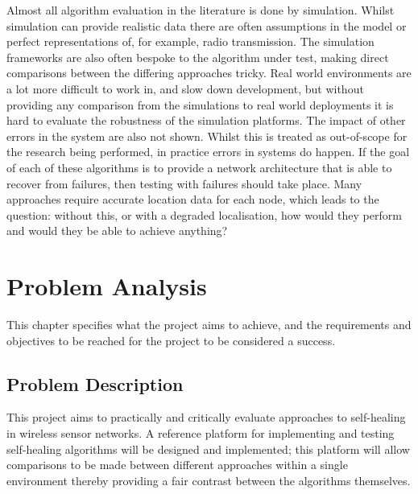 \documentclass[authoryearcitations]{UoYCSproject}
\begin{document}

Almost all algorithm evaluation in the literature is done by simulation. Whilst simulation can provide realistic data there are often assumptions in the model or perfect representations of, for example, radio transmission. The simulation frameworks are also often bespoke to the algorithm under test, making direct comparisons between the differing approaches tricky. Real world environments are a lot more difficult to work in, and slow down development, but without providing any comparison from the simulations to real world deployments it is hard to evaluate the robustness of the simulation platforms. The impact of other errors in the system are also not shown. Whilst this is treated as out-of-scope for the research being performed, in practice errors in systems do happen. If the goal of each of these algorithms is to provide a network architecture that is able to recover from failures, then testing with failures should take place. Many approaches require accurate location data for each node, which leads to the question: without this, or with a degraded localisation, how would they perform and would they be able to achieve anything?



%

\chapter{Problem Analysis}
\label{cha:Problem}

This chapter specifies what the project aims to achieve, and the requirements and objectives to be reached for the project to be considered a success.

\section{Problem Description}
This project aims to practically and critically evaluate approaches to self-healing in wireless sensor networks. A reference platform for implementing and testing self-healing algorithms will be designed and implemented; this platform will allow comparisons to be made between different approaches within a single environment thereby providing a fair contrast between the algorithms themselves.
\end{document}

